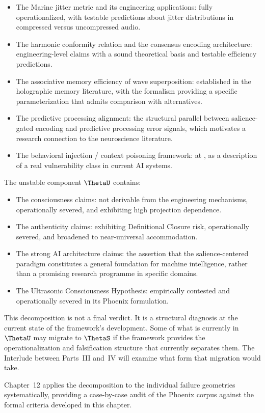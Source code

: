 \begin{itemize}
  \item The Marine jitter metric and its engineering
  applications: fully operationalized, with testable
  predictions about jitter distributions in compressed
  versus uncompressed audio.
  \item The harmonic conformity relation and the
  consensus encoding architecture: engineering-level
  claims with a sound theoretical basis and testable
  efficiency predictions.
  \item The associative memory efficiency of wave
  superposition: established in the holographic memory
  literature, with the \MEMeight{} formalism providing
  a specific parameterization that admits comparison
  with alternatives.
  \item The predictive processing alignment: the
  structural parallel between salience-gated encoding
  and predictive processing error signals, which
  motivates a research connection to the neuroscience
  literature.
  \item The behavioral injection / context poisoning
  framework: at \LevelI{}, as a description of a
  real vulnerability class in current AI systems.
\end{itemize}

The unstable component $\ThetaU$ contains:

\begin{itemize}
  \item The consciousness claims: not derivable from
  the engineering mechanisms, operationally severed,
  and exhibiting high projection dependence.
  \item The authenticity claims: exhibiting Definitional
  Closure risk, operationally severed, and broadened
  to near-universal accommodation.
  \item The strong AI architecture claims: the assertion
  that the salience-centered paradigm constitutes a
  general foundation for machine intelligence, rather
  than a promising research programme in specific domains.
  \item The Ultrasonic Consciousness Hypothesis:
  empirically contested and operationally severed
  in its Phoenix formulation.
\end{itemize}

\medskip

This decomposition is not a final verdict. It is a
structural diagnosis at the current state of the
framework's development. Some of what is currently in
$\ThetaU$ may migrate to $\ThetaS$ if the framework
provides the operationalization and falsification
structure that currently separates them. The Interlude
between Parts~III and~IV will examine what form that
migration would take.

Chapter~12 applies the decomposition to the
individual failure geometries systematically, providing
a case-by-case audit of the Phoenix corpus against
the formal criteria developed in this chapter.
